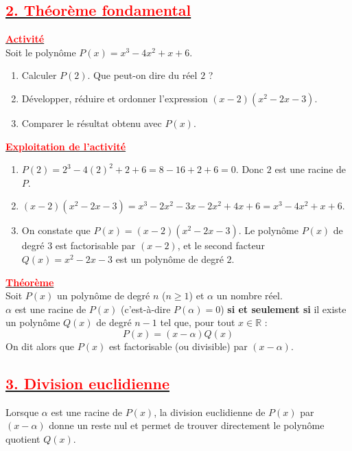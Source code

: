 \documentclass[12pt,a4paper]{article}
\begin{document}
\subsection*{\underline{\textbf{\textcolor{red}{2. Théorème fondamental}}}}

\underline{\textbf{\textcolor{red}{Activité}}} \\
Soit le polynôme $P(x) = x^3 - 4x^2 + x + 6$.
\begin{enumerate}
    \item Calculer $P(2)$. Que peut-on dire du réel $2$ ?
    \item Développer, réduire et ordonner l'expression $(x - 2)(x^2 - 2x - 3)$.
    \item Comparer le résultat obtenu avec $P(x)$.
\end{enumerate}

\medskip
\underline{\textbf{\textcolor{red}{Exploitation de l’activité}}}
\begin{enumerate}
    \item $P(2) = 2^3 - 4(2)^2 + 2 + 6 = 8 - 16 + 2 + 6 = 0$. Donc $2$ est une racine de $P$.
    \item $(x - 2)(x^2 - 2x - 3) = x^3 - 2x^2 - 3x - 2x^2 + 4x + 6 = x^3 - 4x^2 + x + 6$.
    \item On constate que $P(x) = (x - 2)(x^2 - 2x - 3)$. Le polynôme $P(x)$ de degré $3$ est factorisable par $(x - 2)$, et le second facteur $Q(x) = x^2 - 2x - 3$ est un polynôme de degré $2$.
\end{enumerate}

\medskip
\underline{\textbf{\textcolor{red}{Théorème}}} \\
Soit $P(x)$ un polynôme de degré $n$ ($n \geq 1$) et $\alpha$ un nombre réel. \\
$\alpha$ est une racine de $P(x)$ (c'est-à-dire $P(\alpha) = 0$) \textbf{si et seulement si} il existe un polynôme $Q(x)$ de degré $n - 1$ tel que, pour tout $x \in \mathbb{R}$ :
$$P(x) = (x - \alpha)Q(x)$$
On dit alors que $P(x)$ est factorisable (ou divisible) par $(x - \alpha)$.

\subsection*{\underline{\textbf{\textcolor{red}{3. Division euclidienne}}}}
Lorsque $\alpha$ est une racine de $P(x)$, la division euclidienne de $P(x)$ par $(x - \alpha)$ donne un reste nul et permet de trouver directement le polynôme quotient $Q(x)$.
\end{document}
